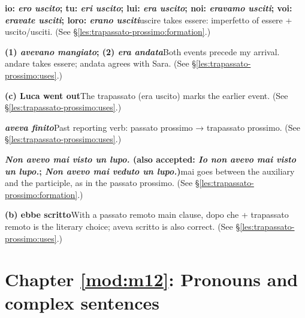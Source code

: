 \documentclass[11pt,a4paper,twoside,openright]{book}
\newcommand{\answerheading}[1]{\par\medskip\noindent{\sffamily\bfseries\small #1}\par\nopagebreak}
\begin{document}
\answerheading{\S\ref{les:trapassato-prossimo} Trapassato prossimo}\label{ans:trapassato-prossimo}
\begin{answers}
\item\relax \textbf{io: \textit{ero uscito}; tu: \textit{eri uscito}; lui: \textit{era uscito}; noi: \textit{eravamo usciti}; voi: \textit{eravate usciti}; loro: \textit{erano usciti}}\newline uscire takes essere: imperfetto of essere + uscito/usciti. {\color{muted}(See \S\ref{les:trapassato-prossimo:formation}.)}
\item\relax \textbf{(1) \textit{avevano mangiato}; (2) \textit{era andata}}\newline Both events precede my arrival. andare takes essere; andata agrees with Sara. {\color{muted}(See \S\ref{les:trapassato-prossimo:uses}.)}
\item\relax \textbf{(c) Luca went out}\newline The trapassato (era uscito) marks the earlier event. {\color{muted}(See \S\ref{les:trapassato-prossimo:uses}.)}
\item\relax \textbf{\textit{aveva finito}}\newline Past reporting verb: passato prossimo → trapassato prossimo. {\color{muted}(See \S\ref{les:trapassato-prossimo:uses}.)}
\item\relax \textbf{\textit{Non avevo mai visto un lupo.} {\color{muted}(also accepted: \textit{Io non avevo mai visto un lupo.}; \textit{Non avevo mai veduto un lupo.})}}\newline mai goes between the auxiliary and the participle, as in the passato prossimo. {\color{muted}(See \S\ref{les:trapassato-prossimo:formation}.)}
\item\relax \textbf{(b) ebbe scritto}\newline With a passato remoto main clause, dopo che + trapassato remoto is the literary choice; aveva scritto is also correct. {\color{muted}(See \S\ref{les:trapassato-prossimo:uses}.)}
\end{answers}

\section*{Chapter \ref{mod:m12}: Pronouns and complex sentences}
\end{document}
